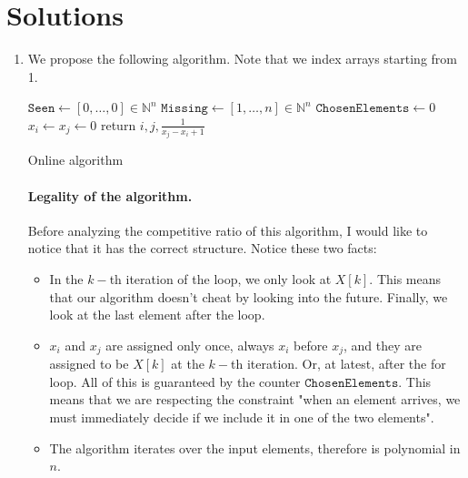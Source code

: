 \documentclass[11pt]{article}
\begin{document}
\section*{Solutions}
\begin{enumerate}
    \item We propose the following algorithm. Note that we index arrays starting from 1.
    \begin{algorithm}[!ht]
        \DontPrintSemicolon
        $\mathtt{Seen} \gets [0,\dots,0] \in \mathbb{N}^n$\;
        $\mathtt{Missing} \gets [1,\dots,n] \in \mathbb{N}^n$\;
        $\mathtt{ChosenElements} \gets 0$\;
        $x_i \gets x_j \gets 0$\;
        return $i, j, \frac{1}{x_j-x_i+1}$\;
        \caption{Online algorithm}\label{a}
        \end{algorithm}
        \paragraph*{Legality of the algorithm.}
        Before analyzing the competitive ratio of this algorithm, I would like to notice that it has the correct structure. Notice these two facts:
        \begin{itemize}
            \item In the $k-$th iteration of the loop, we only look at $X[k]$. This means that our algorithm doesn't cheat by looking into the future. Finally, we look at the last element after the loop.
            \item $x_i$ and $x_j$ are assigned only once, always $x_i$ before $x_j$, and they are assigned to be $X[k]$ at the $k-$th iteration. Or, at latest, after the for loop. All of this is guaranteed by the counter $\mathtt{ChosenElements}$. This means that we are respecting the constraint "when an element arrives, we must immediately decide if we include it in one of the two elements".
            \item The algorithm iterates over the input elements, therefore is polynomial in $n$.
        \end{itemize}

\end{enumerate}
\end{document}
